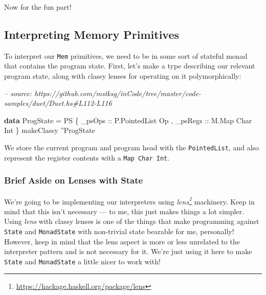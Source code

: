 \documentclass[]{article}
\newenvironment{Shaded}{}{}
\newcommand{\CharTok}[1]{\textcolor[rgb]{0.25,0.44,0.63}{#1}}
\newcommand{\CommentTok}[1]{\textcolor[rgb]{0.38,0.63,0.69}{\textit{#1}}}
\newcommand{\DataTypeTok}[1]{\textcolor[rgb]{0.56,0.13,0.00}{#1}}
\newcommand{\FunctionTok}[1]{\textcolor[rgb]{0.02,0.16,0.49}{#1}}
\newcommand{\KeywordTok}[1]{\textcolor[rgb]{0.00,0.44,0.13}{\textbf{#1}}}
\newcommand{\NormalTok}[1]{#1}
\newcommand{\OtherTok}[1]{\textcolor[rgb]{0.00,0.44,0.13}{#1}}
\renewcommand{\href}[2]{#2\footnote{\url{#1}}}
\begin{document}
Now for the fun part!

\hypertarget{interpreting-memory-primitives}{%
\subsection{Interpreting Memory
Primitives}\label{interpreting-memory-primitives}}

To interpret our \texttt{Mem} primitives, we need to be in some sort of stateful
monad that contains the program state. First, let's make a type describing our
relevant program state, along with classy lenses for operating on it
polymorphically:

\begin{Shaded}
\begin{Highlighting}[]
\CommentTok{-- source: https://github.com/mstksg/inCode/tree/master/code-samples/duet/Duet.hs#L112-L116}

\KeywordTok{data} \DataTypeTok{ProgState} \FunctionTok{=} \DataTypeTok{PS}
\NormalTok{    \{}\OtherTok{ _psOps  ::} \DataTypeTok{P.PointedList} \DataTypeTok{Op}
\NormalTok{    ,}\OtherTok{ _psRegs ::} \DataTypeTok{M.Map} \DataTypeTok{Char} \DataTypeTok{Int}
\NormalTok{    \}}
\NormalTok{makeClassy }\CharTok{''}\DataTypeTok{ProgState}
\end{Highlighting}
\end{Shaded}

We store the current program and program head with the \texttt{PointedList}, and
also represent the register contents with a \texttt{Map\ Char\ Int}.

\hypertarget{brief-aside-on-lenses-with-state}{%
\subsubsection{Brief Aside on Lenses with
State}\label{brief-aside-on-lenses-with-state}}

We're going to be implementing our interpreters using
\emph{\href{https://hackage.haskell.org/package/lens}{lens}} machinery. Keep in
mind that this isn't necessary --- to me, this just makes things a lot simpler.
Using \emph{lens} with classy lenses is one of the things that make programming
against \texttt{State} and \texttt{MonadState} with non-trivial state bearable
for me, personally! However, keep in mind that the lens aspect is more or less
unrelated to the interpreter pattern and is not necessary for it. We're just
using it here to make \texttt{State} and \texttt{MonadState} a little nicer to
work with!
\end{document}
